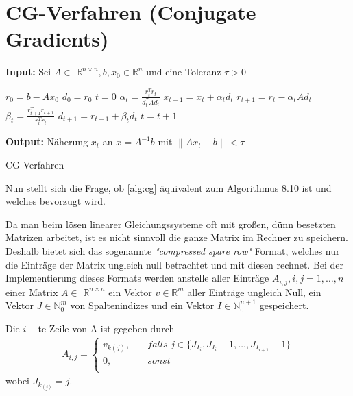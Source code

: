 \documentclass[12pt,a4paper]{scrartcl}
\numberwithin{equation}{section}
\numberwithin{myalgctr}{section}
\numberwithin{mytheoremctr}{subsection}
\numberwithin{mykorollarctr}{subsection}
\numberwithin{mylemmactr}{subsection}
\numberwithin{mybeispielctr}{subsection}
\newcommand\norm[1]{\left\lVert#1\right\rVert}
\begin{document}
	\section{CG-Verfahren (Conjugate Gradients)}
	
	\begin{algorithm}[H]
		\textbf{Input:} Sei $A\in$ $\mathbb{R}^{n\times n}, b, x_0 \in \mathbb{R}^{n}$ und eine Toleranz $\tau > 0$
		\begin{algorithmic}[1]
			\State $r_0 = b - Ax_0$
			\State $d_0 = r_0$
			\State $t = 0$
			\While{$ \norm{r_t} > \tau $}
			\State $\alpha_t = \frac{r_t^{T}r_t}{d_t^{T}Ad_t}$
			\State $x_{t+1} = x_{t} + \alpha_t d_t$
			\State $r_{t+1} = r_t - \alpha_t Ad_t$
			\State $\beta_t = \frac{r_{t+1}^{T}r_{t+1}}{r_t^{T}r_t}$
			\State $d_{t+1} = r_{t+1} + \beta_td_t$
			\State $t = t + 1$
			\EndWhile
		\end{algorithmic}
		\textbf{Output:} Näherung $x_t$ an $x = A^{-1}b$ mit $\norm{Ax_t-b} < \tau$
		
		\caption{CG-Verfahren} \label{alg:cg}
	\end{algorithm}
	
	Nun stellt sich die Frage, ob \cref{alg:cg} äquivalent zum Algorithmus 8.10 \autocite[101]{skript} ist und welches bevorzugt wird.
	
	\newpage
	
	Da man beim lösen linearer Gleichungssysteme oft mit großen, dünn besetzten Matrizen arbeitet, ist es nicht sinnvoll die ganze Matrix im Rechner zu speichern. Deshalb bietet sich das sogenannte \textit{"compressed spare row"} Format, welches nur die Einträge der Matrix ungleich null betrachtet und mit diesen rechnet. Bei der Implementierung dieses Formats werden anstelle aller Einträge $A_{i,j}, i,j = 1,\ldots,n$ einer Matrix $A\in$ $\mathbb{R}^{n\times n}$ ein Vektor $v\in\mathbb{R}^{m}$ aller Einträge ungleich Null, ein Vektor $J\in\mathbb{N}_0^{m}$ von Spaltenindizes und ein Vektor $I\in\mathbb{N}_0^{n+1}$ gespeichert.
	
	Die $i-$te Zeile von A ist gegeben durch
	\begin{align*}
		A_{i,j} = 
		\begin{cases}
			\textit{$v_{k(j)}$},&\quad\textit{falls $j \in \{J_{I_i}, J_{I_{i}} + 1, \ldots, J_{I_{i+1}} - 1$}\}\\
			\textit{0},&\quad\textit{sonst}\\
		\end{cases}
	\end{align*} 
	wobei $J_{k_{(j)}} = j$.\\
	
\end{document}
